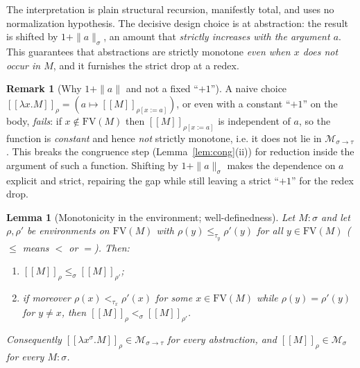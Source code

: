 \documentclass{amsart}
\newtheorem{lemma}{Lemma}
\theoremstyle{definition}
\newtheorem{remark}{Remark}
\newcommand{\interp}[1]{[\![#1]\!]}
\newcommand{\FV}{\mathrm{FV}}
\begin{document}
The interpretation is plain structural recursion, manifestly total, and uses no
normalization hypothesis. The decisive design choice is at abstraction: the result is
shifted by $1+\|a\|_\sigma$, an amount that \emph{strictly increases with the argument
$a$}. This guarantees that abstractions are strictly monotone \emph{even when $x$ does
not occur in $M$}, and it furnishes the strict drop at a redex.

\begin{remark}[Why $1+\|a\|$ and not a fixed ``$+1$'']\label{rem:why}
A naive choice $\interp{\lambda x.M}_\rho=(a\mapsto\interp{M}_{\rho[x:=a]})$, or even
with a constant ``$+1$'' on the body, \emph{fails}: if $x\notin\FV(M)$ then
$\interp{M}_{\rho[x:=a]}$ is independent of $a$, so the function is \emph{constant} and
hence \emph{not} strictly monotone, i.e. it does not lie in $\mathcal M_{\sigma\to\tau}$.
This breaks the congruence step (Lemma~\ref{lem:cong}(ii)) for reduction inside the
argument of such a function. Shifting by $1+\|a\|_\sigma$ makes the dependence on $a$
explicit and strict, repairing the gap while still leaving a strict ``$+1$'' for the
redex drop.
\end{remark}

\begin{lemma}[Monotonicity in the environment; well-definedness]\label{lem:mono}
Let $M:\sigma$ and let $\rho,\rho'$ be environments on $\FV(M)$ with
$\rho(y)\le_{\tau_y}\rho'(y)$ for all $y\in\FV(M)$ \emph{(}$\le$ means $<$ or $=$\emph{)}.
Then:
\begin{enumerate}
\item[(a)] $\interp{M}_\rho\le_\sigma\interp{M}_{\rho'}$;
\item[(b)] if moreover $\rho(x)<_{\tau_x}\rho'(x)$ for some $x\in\FV(M)$ while
  $\rho(y)=\rho'(y)$ for $y\neq x$, then $\interp{M}_\rho<_\sigma\interp{M}_{\rho'}$.
\end{enumerate}
Consequently $\interp{\lambda x^\sigma.M}_\rho\in\mathcal M_{\sigma\to\tau}$ for every
abstraction, and $\interp{M}_\rho\in\mathcal M_\sigma$ for every $M:\sigma$.
\end{lemma}
\end{document}
